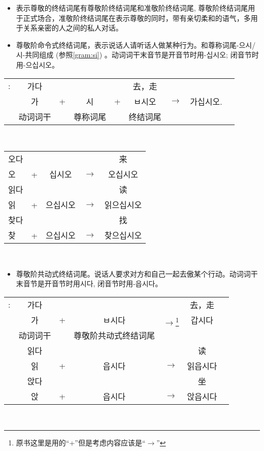 \begin{grammar}
\begin{grammarsect}[尊敬阶终结词尾]
        \begin{itemize}
            \item 表示尊敬的终结词尾有尊敬阶终结词尾和准敬阶终结词尾, 尊敬阶终结词尾用于正式场合，准敬阶终结词尾在表示尊敬的同时，带有亲切柔和的语气，多用于关系亲密的人之间的私人对话。
        \end{itemize}
    \end{grammarsect}
    \begin{grammarsect}[\kr -ㅂ시오]
        \begin{itemize}
            \item 尊敬阶命令式终结词尾，表示说话人请听话人做某种行为。和尊称词尾{\kr -으시/시-}共同组成 (参照\ref{gram:si}) 。动词词干末音节是开音节时用-십시오;
闭音节时用{\kr -으십시오}。 
        \end{itemize}
        \begin{tabular}{ccccccccc}
            \kr \ruby{例}{예}:&\kr 가다&&&&去，走\\
            &\kr 가&+&\kr 시&+&\kr ㅂ시오&$\to$&\kr 가십시오.\\\cline{2-2}\cline{4-4}\cline{6-6}
            &动词词干&&尊称词尾&&终结词尾
        \end{tabular}\\
        \begin{tabular}{lcccc}
            \kr 오다 &&&&来\\
            \kr 오 &+ &\kr 십시오&$\to$&\kr 오십시오\\
            \kr 읽다 &&&&读\\
            \kr 읽 &+&\kr 으십시오&$\to$&\kr 읽으십시오\\
            \kr 찾다 &&&&找 \\
            \kr 찾 &+ &\kr 으십시오&$\to$&\kr 찾으십시오 
        \end{tabular}\\
    \end{grammarsect}
    \begin{grammarsect}[\kr -(으){}ㅂ시다]
        \begin{itemize}
            \item 尊敬阶共动式终结词尾。说话人要求对方和自己一起去傲某个行动。动词词干末音节是开音节时用{\kr 시다}, 闭音节时用{\kr -읍시다}。
        \end{itemize}
        \begin{tabular}{ccccccc}
            \kr \ruby{例}{예}:&\kr 가다&&&&去，走\\
            &\kr 가&+&\kr ㅂ시다&$\to$\footnote{原书这里是用的``+''但是考虑内容应该是``$\to$''}&\kr 갑시다\\\cline{2-2}\cline{4-4}
            &动词词干&&尊敬阶共动式终结词尾\\
            &\kr 읽다 &&&&读\\
            &\kr 읽 &+&\kr 읍시다&$\to$&\kr  읽읍시다\\
            &\kr 앉다 &&&&坐\\
            &\kr 앉 &+&\kr 읍시다&$\to$&\kr 앉읍시다
        \end{tabular}\\
    \end{grammarsect}
\end{grammar}
